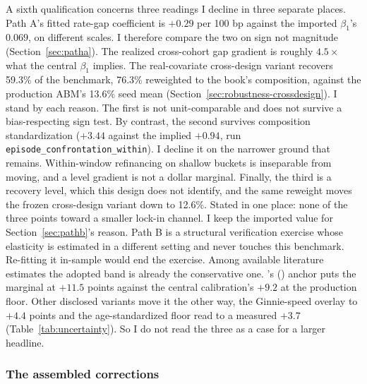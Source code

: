 \documentclass[12pt]{article}
\newcommand{\citepos}[1]{\citeauthor{#1}'s (\citeyear{#1})}
\begin{document}
A sixth qualification concerns three readings I decline in three separate places. Path A's fitted rate-gap coefficient is $+0.29$ per 100 bp against the imported $\beta_1$'s $0.069$, on different scales. I therefore compare the two on sign not magnitude (Section~\ref{sec:patha}). The realized cross-cohort gap gradient is roughly $4.5\times$ what the central $\beta_1$ implies. The real-covariate cross-design variant recovers 59.3\% of the benchmark, 76.3\% reweighted to the book's composition, against the production ABM's 13.6\% seed mean (Section~\ref{sec:robustness-crossdesign}). I stand by each reason. The first is not unit-comparable and does not survive a bias-respecting sign test. By contrast, the second survives composition standardization ($+3.44$ against the implied $+0.94$, run \texttt{episode\_confrontation\_within}). I decline it on the narrower ground that remains. Within-window refinancing on shallow buckets is inseparable from moving, and a level gradient is not a dollar marginal. Finally, the third is a recovery level, which this design does not identify, and the same reweight moves the frozen cross-design variant down to 12.6\%. Stated in one place: none of the three points toward a smaller lock-in channel. I keep the imported value for Section~\ref{sec:pathb}'s reason. Path B is a structural verification exercise whose elasticity is estimated in a different setting and never touches this benchmark. Re-fitting it in-sample would end the exercise. Among available literature estimates the adopted band is already the conservative one. \citepos{fonseca2024} anchor puts the marginal at $+11.5$ points against the central calibration's $+9.2$ at the production floor. Other disclosed variants move it the other way, the Ginnie-speed overlay to $+4.4$ points and the age-standardized floor read to a measured $+3.7$ (Table~\ref{tab:uncertainty}). So I do not read the three as a case for a larger headline.

\subsubsection{The assembled corrections}
\end{document}
